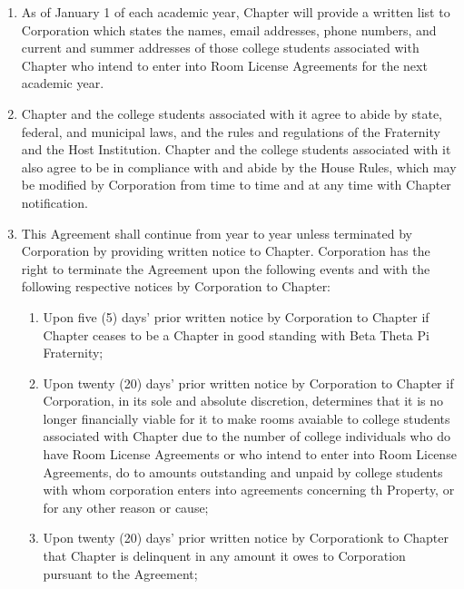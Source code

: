 \documentclass[12pt]{article}
\begin{document}
\begin{enumerate}
        \item As of January 1 of each academic year, Chapter will provide a written list to Corporation which states the names, email addresses, phone numbers, and current and summer addresses of those college students associated with Chapter who intend to enter into Room License Agreements for the next academic year.

        \item Chapter and the college students associated with it agree to abide by state, federal, and municipal laws, and the rules and regulations of the Fraternity and the Host Institution.
                Chapter and the college students associated with it also agree to be in compliance with and abide by the House Rules, which may be modified by Corporation from time to time and at any time with Chapter notification.

        \item This Agreement shall continue from year to year unless terminated by Corporation by providing written notice to Chapter.
                Corporation has the right to terminate the Agreement upon the following events and with the following respective notices by Corporation to Chapter:

                \begin{enumerate}[label=\alph*.]
                        \item Upon five (5) days' prior written notice by Corporation to Chapter if Chapter ceases to be a Chapter in good standing with Beta Theta Pi Fraternity;

                        \item Upon twenty (20) days' prior written notice by Corporation to Chapter if Corporation, in its sole and absolute discretion, determines that it is no longer financially viable for it to make rooms avaiable to college students associated with Chapter due to the number of college individuals who do have Room License Agreements or who intend to enter into Room License Agreements, do to amounts outstanding and unpaid by college students with whom corporation enters into agreements concerning th Property, or for any other reason or cause;

                        \item Upon twenty (20) days' prior written notice by Corporationk to Chapter that Chapter is delinquent in any amount it owes to Corporation pursuant to the Agreement;
                \end{enumerate}


\end{enumerate}
\end{document}
